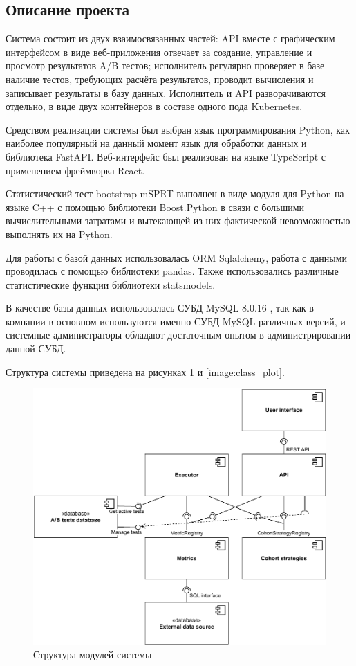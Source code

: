 \documentclass[../document.tex]{subfiles}
\begin{document}
	\subsection{Описание проекта}
	\par Система состоит из двух взаимосвязанных частей: API вместе с графическим интерфейсом в виде веб-приложения отвечает за создание, управление и просмотр результатов A/B тестов; исполнитель регулярно проверяет в базе наличие тестов, требующих расчёта результатов, проводит вычисления и записывает результаты в базу данных. Исполнитель и API разворачиваются отдельно, в виде двух контейнеров в составе одного пода Kubernetes\cite{kubernetes}.
	\par Средством реализации системы был выбран язык программирования Python\cite{python}, как наиболее популярный на данный момент язык для обработки данных и библиотека FastAPI\cite{fastapi}. Веб-интерфейс был реализован на языке TypeScript\cite{typescript} с применением фреймворка React\cite{react}.
	\par Статистический тест bootstrap mSPRT выполнен в виде модуля для Python на языке C++ с помощью библиотеки Boost.Python\cite{boost_python} в связи с большими вычислительными затратами и вытекающей из них фактической невозможностью выполнять их на Python.
	\par Для работы с базой данных использовалась ORM Sqlalchemy\cite{sqlalchemy}, работа с данными проводилась с помощью библиотеки pandas. Также использовались различные статистические функции библиотеки statsmodels\cite{statsmodels}.
	\par В качестве базы данных использовалась СУБД MySQL 8.0.16 \cite{mysql}, так как в компании в основном используются именно СУБД MySQL различных версий, и системные администраторы обладают достаточным опытом в администрировании данной СУБД.
	\par Структура системы приведена на рисунках \ref{image:module_plot} и \ref{image:class_plot}.
	\begin{figure}[h]
		\centering
		\includegraphics{component_diagram.pdf}
		\caption{\label{image:module_plot}Структура модулей системы}
	\end{figure}
\end{document}
